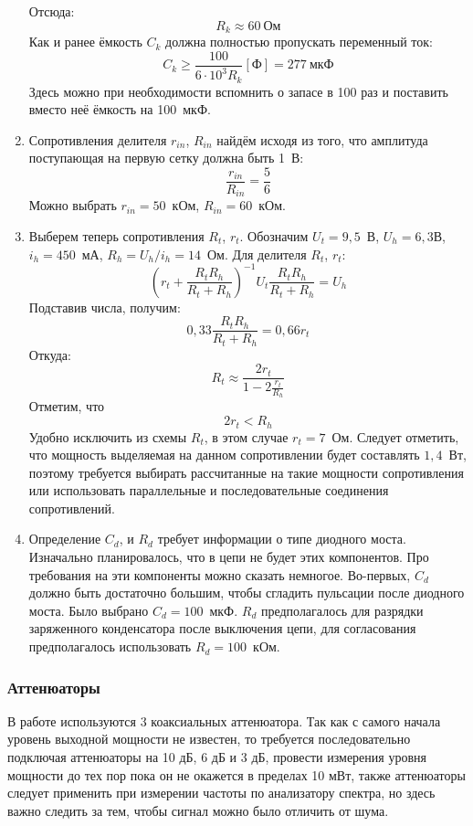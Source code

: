 \documentclass[a4paper,14pt]{extarticle}
\begin{document}
\begin{enumerate}
\[		\]
		Отсюда:
		\[
			R_k \approx 60~\text{Ом}
		\]
		Как и ранее ёмкость $C_k$ должна полностью пропускать переменный ток:
		\[
			C_k \geq \frac{100}{6\cdot10^3 R_k} [\text{Ф}] = 277~\text{мкФ}
		\]
		Здесь можно при необходимости вспомнить о запасе в 100 раз и поставить вместо неё ёмкость на 100~мкФ.
		\item
		Сопротивления делителя $r_{in}$, $R_{in}$ найдём исходя из того, что амплитуда поступающая на первую сетку должна быть 1~В:
		\[
			\frac{r_{in}}{R_{in}} = \frac{5}{6}
		\]
		Можно выбрать $r_{in} = 50$~кОм, $R_{in} = 60$~кОм.
		\item 
		Выберем теперь сопротивления $R_t$, $r_t$. Обозначим $U_{t} = 9{,}5$~В, $U_{h} = 6{,}3$В, $i_h=450$~мА, $R_h = U_h/ i_h = 14$~Ом. Для делителя $R_t$, $r_t$:
		\[
			\left(r_t + \frac{R_t R_h}{R_t + R_h}\right)^{-1} U_t  \frac{R_t R_h}{R_t + R_h} = U_h
		\]
		Подставив числа, получим:
		\[
			 0{,}33 \frac{R_t R_h}{R_t + R_h} = 0{,}66 r_t
		\]
		Откуда:
		\[
			R_t \approx \frac{2r_t}{1 - 2 \frac{r_t}{R_h}}
		\]
		Отметим, что
		\[
			2 r_t < R_h
		\]
		Удобно исключить из схемы $R_t$, в этом случае $r_t = 7$~Ом. Следует отметить, что мощность выделяемая на данном сопротивлении будет составлять $1{,}4$~Вт, поэтому требуется выбирать рассчитанные на такие мощности сопротивления или использовать параллельные и последовательные соединения сопротивлений.
		\item 
		Определение $C_d$, и $R_d$ требует информации о типе диодного моста. Изначально планировалось, что в цепи не будет этих компонентов. Про требования на эти компоненты можно сказать немногое. Во-первых, $C_d$ должно быть достаточно большим, чтобы сгладить пульсации после диодного моста. Было выбрано $C_d = 100$~мкФ. $R_d$ предполагалось для разрядки заряженного конденсатора после выключения цепи, для согласования предполагалось использовать $R_d = 100$~кОм.
	\end{enumerate}

    \subsubsection{Аттенюаторы}
	
	В работе используются 3 коаксиальных аттенюатора. Так как с самого начала уровень выходной мощности не известен, то требуется последовательно подключая аттенюаторы на 10 дБ, 6 дБ и 3 дБ, провести измерения уровня мощности до тех пор пока он не окажется в пределах 10 мВт, также аттенюаторы следует применить при измерении частоты по анализатору спектра, но здесь важно следить за тем, чтобы сигнал можно было отличить от шума. 
    
\end{document}
